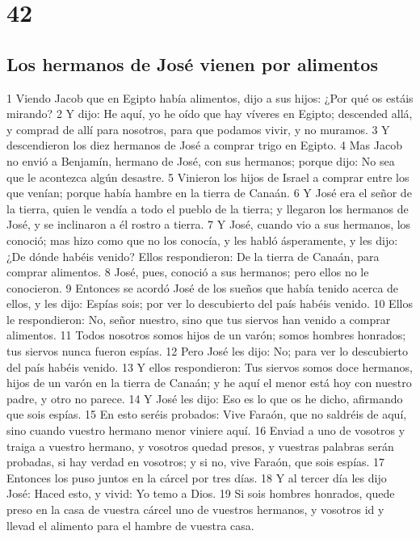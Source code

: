 \chapter{42}

\section*{Los hermanos de José vienen por alimentos}

1 Viendo Jacob que en Egipto había alimentos, dijo a sus hijos: ¿Por qué os estáis mirando?
2 Y dijo: He aquí, yo he oído que hay víveres en Egipto; descended allá, y comprad de allí para nosotros, para que podamos vivir, y no muramos.
3 Y descendieron los diez hermanos de José a comprar trigo en Egipto.
4 Mas Jacob no envió a Benjamín, hermano de José, con sus hermanos; porque dijo: No sea que le acontezca algún desastre.
5 Vinieron los hijos de Israel a comprar entre los que venían; porque había hambre en la tierra de Canaán.
6 Y José era el señor de la tierra, quien le vendía a todo el pueblo de la tierra; y llegaron los hermanos de José, y se inclinaron a él rostro a tierra.
7 Y José, cuando vio a sus hermanos, los conoció; mas hizo como que no los conocía, y les habló ásperamente, y les dijo: ¿De dónde habéis venido? Ellos respondieron: De la tierra de Canaán, para comprar alimentos.
8 José, pues, conoció a sus hermanos; pero ellos no le conocieron.
9 Entonces se acordó José de los sueños que había tenido acerca de ellos, y les dijo: Espías sois; por ver lo descubierto del país habéis venido.
10 Ellos le respondieron: No, señor nuestro, sino que tus siervos han venido a comprar alimentos.
11 Todos nosotros somos hijos de un varón; somos hombres honrados; tus siervos nunca fueron espías.
12 Pero José les dijo: No; para ver lo descubierto del país habéis venido.
13 Y ellos respondieron: Tus siervos somos doce hermanos, hijos de un varón en la tierra de Canaán; y he aquí el menor está hoy con nuestro padre, y otro no parece.
14 Y José les dijo: Eso es lo que os he dicho, afirmando que sois espías.
15 En esto seréis probados: Vive Faraón, que no saldréis de aquí, sino cuando vuestro hermano menor viniere aquí.
16 Enviad a uno de vosotros y traiga a vuestro hermano, y vosotros quedad presos, y vuestras palabras serán probadas, si hay verdad en vosotros; y si no, vive Faraón, que sois espías.
17 Entonces los puso juntos en la cárcel por tres días.
18 Y al tercer día les dijo José: Haced esto, y vivid: Yo temo a Dios.
19 Si sois hombres honrados, quede preso en la casa de vuestra cárcel uno de vuestros hermanos, y vosotros id y llevad el alimento para el hambre de vuestra casa.
